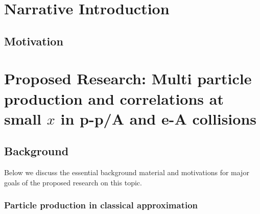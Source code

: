 \noindent

\section{Narrative Introduction}
    \label{sec:introduction}
    

    \vspace{0.5em}
    \subsection{Motivation}
        \label{sec:motivation}
        




\section{Proposed Research: Multi particle production and correlations at small $x$ in p-p/A and 
e-A collisions}
    \label{sec:p1}

    \vspace{0.5em}
    \subsection{Background}
    \label{sec:p1b}

Below we discuss the essential background material and motivations for major
goals of the proposed research on this topic. 

\subsubsection*{Particle production in classical approximation}
	
